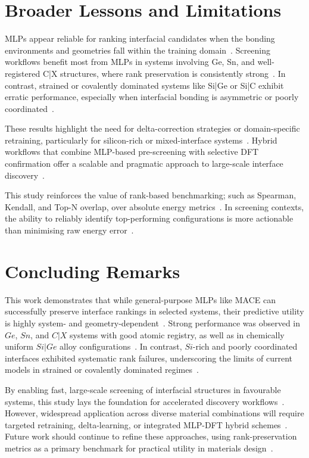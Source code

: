 \section{Broader Lessons and Limitations} \label{section:broader_lessons_and_limitations}

MLPs appear reliable for ranking interfacial candidates when the bonding environments and geometries fall within the training domain~\nocite{}.
Screening workflows benefit most from MLPs in systems involving Ge, Sn, and well-registered C|X structures, where rank preservation is consistently strong~\nocite{}.
In contrast, strained or covalently dominated systems like Si|Ge or Si|C exhibit erratic performance, especially when interfacial bonding is asymmetric or poorly coordinated~\nocite{}.

These results highlight the need for delta-correction strategies or domain-specific retraining, particularly for silicon-rich or mixed-interface systems~\nocite{}.
Hybrid workflows that combine MLP-based pre-screening with selective DFT confirmation offer a scalable and pragmatic approach to large-scale interface discovery~\nocite{}.

This study reinforces the value of rank-based benchmarking; such as Spearman, Kendall, and Top-N overlap, over absolute energy metrics~\nocite{}.
In screening contexts, the ability to reliably identify top-performing configurations is more actionable than minimising raw energy error~\nocite{}.

\section{Concluding Remarks} \label{section:concluding_remarks}

This work demonstrates that while general-purpose MLPs like MACE can successfully preserve interface rankings in selected systems, their predictive utility is highly system- and geometry-dependent~\nocite{}.
Strong performance was observed in $Ge$, $Sn$, and $C|X$ systems with good atomic registry, as well as in chemically uniform $Si|Ge$ alloy configurations~\nocite{}.
In contrast, $Si$-rich and poorly coordinated interfaces exhibited systematic rank failures, underscoring the limits of current models in strained or covalently dominated regimes~\nocite{}.

By enabling fast, large-scale screening of interfacial structures in favourable systems, this study lays the foundation for accelerated discovery workflows~\nocite{}.
However, widespread application across diverse material combinations will require targeted retraining, delta-learning, or integrated MLP-DFT hybrid schemes~\nocite{}.
Future work should continue to refine these approaches, using rank-preservation metrics as a primary benchmark for practical utility in materials design~\nocite{}.

